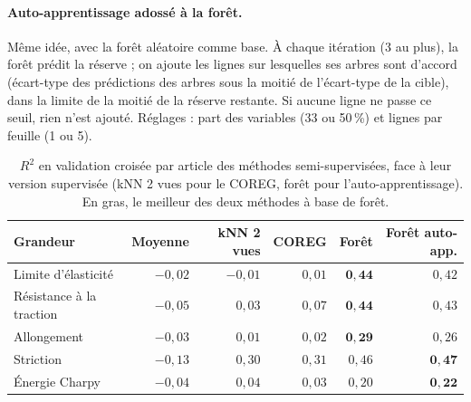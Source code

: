 \paragraph{Auto-apprentissage adossé à la forêt.} Même idée, avec la forêt aléatoire
comme base. À chaque itération (3 au plus), la forêt prédit la réserve ; on ajoute les
lignes sur lesquelles ses arbres sont d'accord (écart-type des prédictions des arbres
sous la moitié de l'écart-type de la cible), dans la limite de la moitié de la réserve
restante. Si aucune ligne ne passe ce seuil, rien n'est ajouté. Réglages : part des
variables (33 ou 50\,\%) et lignes par feuille (1 ou 5).

\begin{table}[!htbp]
  \centering\small
  \begin{tabular}{@{}l r r r r r@{}}
    \toprule
    \textbf{Grandeur} & \textbf{Moyenne} & \textbf{kNN 2 vues} & \textbf{COREG} &
    \textbf{Forêt} & \textbf{Forêt auto-app.} \\
    \midrule
    Limite d'élasticité      & $-0{,}02$ & $-0{,}01$ & $0{,}01$ & $\mathbf{0{,}44}$ & $0{,}42$ \\
    Résistance à la traction & $-0{,}05$ & $0{,}03$  & $0{,}07$ & $\mathbf{0{,}44}$ & $0{,}43$ \\
    Allongement              & $-0{,}03$ & $0{,}01$  & $0{,}02$ & $\mathbf{0{,}29}$ & $0{,}26$ \\
    Striction                & $-0{,}13$ & $0{,}30$  & $0{,}31$ & $0{,}46$ & $\mathbf{0{,}47}$ \\
    Énergie Charpy           & $-0{,}04$ & $0{,}04$  & $0{,}03$ & $0{,}20$ & $\mathbf{0{,}22}$ \\
    \bottomrule
  \end{tabular}
  \caption{$R^2$ en validation croisée par article des méthodes semi-supervisées, face
    à leur version supervisée (kNN 2 vues pour le COREG, forêt pour l'auto-apprentissage).
    En gras, le meilleur des deux méthodes à base de forêt.}
  \label{tab:semi}
\end{table}

